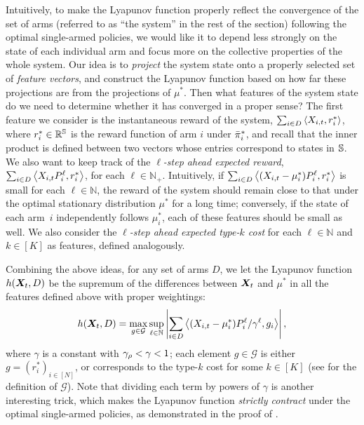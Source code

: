 \documentclass[11pt,letterpaper]{article}
\begin{document}
Intuitively, to make the Lyapunov function properly reflect the convergence of the set of arms (referred to as ``the system'' in the rest of the section) following the optimal single-armed policies, we would like it to depend less strongly on the state of each individual arm and focus more on the collective properties of the whole system. 
Our idea is to \emph{project} the system state onto a properly selected set of \emph{feature vectors}, and construct the Lyapunov function based on how far these projections are from the projections of $\mu^*$. 
Then what features of the system state do we need to determine whether it has converged in a proper sense? 
The first feature we consider is the instantaneous reward of the system, $\sum_{i\in D} \left\langle X_{i,t}, r_i^* \right\rangle$, where $r_i^*\in \mathbb{R}^{\mathbb{S}}$ is the reward function of arm $i$ under ${{\bar{\pi}}^*}_i$, and recall that the inner product is defined between two vectors whose entries correspond to states in $\mathbb{S}$. 
We also want to keep track of the \emph{$\ell$-step ahead expected reward}, $\sum_{i\in D} \left\langle X_{i,t}P_i^{\ell}, r_i^* \right\rangle$, for each $\ell\in \mathbb{N}_+$. 
Intuitively, if $\sum_{i\in D} \left\langle (X_{i,t} -\mu_i^*)P_i^{\ell}, r_i^* \right\rangle$ is small for each $\ell\in \mathbb{N}$, the reward of the system should remain close to that under the optimal stationary distribution $\mu^*$ for a long time; conversely, if the state of each arm~$i$ independently follows $\mu^*_i$, each of these features should be small as well. 
We also consider the \emph{$\ell$-step ahead expected type-$k$ cost} for each $\ell\in \mathbb{N}$ and $k\in [K]$ as features, defined analogously.  

Combining the above ideas, for any set of arms $D$, we let the Lyapunov function $h({\bm{X}}_t, D)$ be the supremum of the differences between ${\bm{X}}_t$ and $\mu^*$ in all the features defined above with proper weightings: 
\begin{equation}\label{eq:h-def-overview}
    h({\bm{X}}_t,D) = \max_{g\in \mathcal{G}} \sup_{\ell\in\mathbb{N}} \left\lvert\sum_{i\in D} \left\langle (X_{i,t}-\mu_i^*) P_i^{\ell} / \gamma^{\ell}, g_i \right\rangle\right\rvert,
\end{equation}
where $\gamma$ is a constant with $\gamma_{\rho}<\gamma<1$; each element $g\in \mathcal{G}$ is either $g = (r_i^*)_{i\in[N]}$, or corresponds to the type-$k$ cost for some $k\in[K]$ (see  for the definition of $\mathcal{G}$). 
Note that dividing each term by powers of $\gamma$ is another interesting trick, 
which makes the Lyapunov function \emph{strictly contract} under the optimal single-armed policies, as demonstrated in the proof of . 
\end{document}
